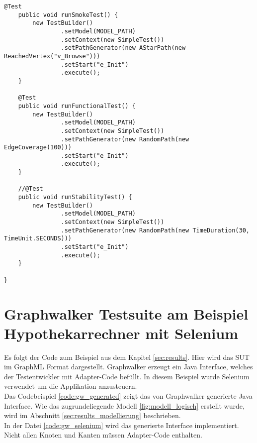 \begin{lstlisting}[caption=SimpleTest.java, label=code:soap_graphwalker]
    @Test
    public void runSmokeTest() {
        new TestBuilder()
                .setModel(MODEL_PATH)
                .setContext(new SimpleTest())
                .setPathGenerator(new AStarPath(new ReachedVertex("v_Browse")))
                .setStart("e_Init")
                .execute();
    }

    @Test
    public void runFunctionalTest() {
        new TestBuilder()
                .setModel(MODEL_PATH)
                .setContext(new SimpleTest())
                .setPathGenerator(new RandomPath(new EdgeCoverage(100)))
                .setStart("e_Init")
                .execute();
    }

    //@Test
    public void runStabilityTest() {
        new TestBuilder()
                .setModel(MODEL_PATH)
                .setContext(new SimpleTest())
                .setPathGenerator(new RandomPath(new TimeDuration(30, TimeUnit.SECONDS)))
                .setStart("e_Init")
                .execute();
    }

}
\end{lstlisting}


\section{Graphwalker Testsuite am Beispiel Hypothekarrechner mit Selenium}
Es folgt der Code zum Beispiel aus dem Kapitel  \ref{sec:results}. Hier wird das \Gls{SUT} im GraphML Format dargestellt. Graphwalker erzeugt ein Java Interface, welches der Testentwickler mit Adapter-Code befüllt. In diesem Beispiel wurde Selenium verwendet um die Applikation anzusteuern.\\

Das Codebeispiel \ref{code:gw_generated} zeigt das von Graphwalker generierte Java Interface. Wie das zugrundeliegende Modell \ref{fig:modell_logisch} erstellt wurde, wird im Abschnitt \ref{sec:results_modellierung} beschrieben.\\

In der Datei \ref{code:gw_selenium} wird das generierte Interface implementiert. Nicht allen Knoten und Kanten müssen Adapter-Code enthalten.\\

